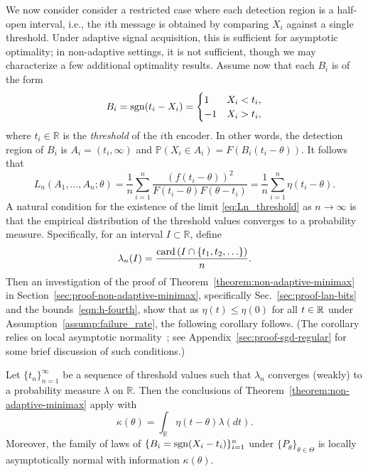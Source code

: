 We now consider consider a restricted case where each detection region is a
half-open interval, i.e., the $i$th message is obtained by comparing $X_i$
against a single threshold. Under adaptive signal acquisition,
this is sufficient for asymptotic optimality;
in non-adaptive settings, it is not sufficient, though we may characterize
a few additional optimality results.
Assume now that each $B_i$ is of the form
\begin{equation}
  \label{eq:threshold_message}
  B_i = \mathrm{sgn}(t_i - X_i) = \begin{cases} 1 & X_i< t_i, \\
    -1 & X_i > t_i,
  \end{cases}  
\end{equation}
where $t_i\in\mathbb R$ is the \emph{threshold} of the $i$th encoder. In
other words, the detection region of $B_i$ is $A_i = (t_i,\infty)$ and
$\mathbb P(X_i \in A_i) = F \left( B_i(t_i-\theta) \right)$. It follows that
\begin{equation}
  L_n(A_1,\ldots,A_n;\theta)
  = \frac{1}{n} \sum_{i=1}^n \frac{ \left(f(t_i-\theta) \right)^2 }{F\left(t_i-\theta \right) F\left(\theta - t_i \right) }  = \frac{1}{n} \sum_{i=1}^n \eta(t_i - \theta).
  \label{eq:Ln_threshold}
\end{equation}
A natural condition for the existence of the limit \eqref{eq:Ln_threshold}
as $n\to \infty$ is that the empirical distribution of the threshold values
converges to a probability measure. Specifically, for an interval $I \subset
\mathbb R$, define
\begin{equation*}
  \lambda_n(I) = \frac{ \mathrm{card} \left( I \cap \{t_1,t_2,\ldots \} \right)}{n}. 
\end{equation*}
Then an investigation of the proof of
Theorem~\ref{theorem:non-adaptive-minimax} in
Section~\ref{sec:proof-non-adaptive-minimax}, specifically
Sec.~\ref{sec:proof-lan-bits} and the bounds~\eqref{eqn:h-fourth}, show that
as $\eta(t) \le \eta(0)$ for all $t \in \mathbb{R}$ under
Assumption~\ref{assump:failure_rate}, the following corollary follows. (The
corollary relies on local asymptotic normality~\cite[Ch.~7]{VanDerVaart98};
see Appendix~\ref{sec:proof-sgd-regular} for some brief discussion of such
conditions.)
\begin{cor} \label{cor:LAN_thresh}
  Let $\{t_n\}_{n=1}^\infty$ be a sequence of threshold values such that
  $\lambda_n$ converges (weakly) to a probability measure $\lambda$ on
  $\mathbb R$. Then the conclusions of
  Theorem~\ref{theorem:non-adaptive-minimax} apply with
  \begin{equation*}
    \kappa(\theta) = \int_{\mathbb R} \eta(t-\theta) \lambda(dt). 
  \end{equation*}
  Moreover, the family of laws of $\{B_i = \mathrm{sgn}(X_i - t_i)\}_{i = 1}^n$
  under $\{P_\theta\}_{\theta \in \Theta}$ is locally asymptotically normal
  with information $\kappa(\theta)$.
\end{cor}

